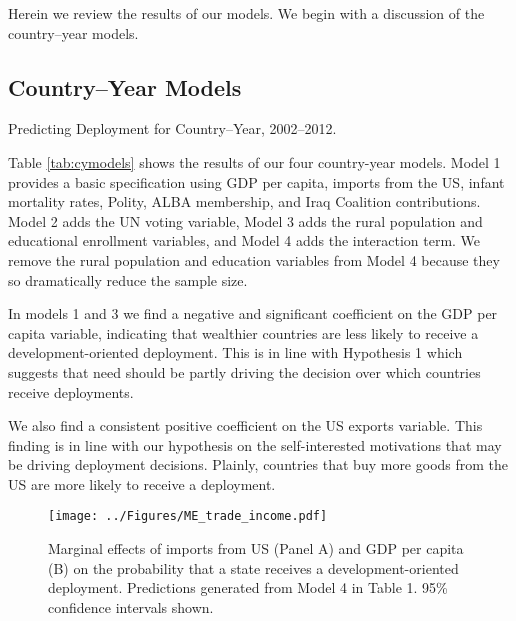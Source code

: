 \documentclass[12pt]{article}
\begin{document}
\begin{doublespace}
Herein we review the results of our models. We begin with a discussion of the country--year models. 


\subsection{Country--Year Models}



\begin{table}[t]
     \caption{Predicting Deployment for Country--Year, 2002--2012.}
     \label{tab:cymodels}
     \centering\scalebox{.75}{}
\end{table}

Table \ref{tab:cymodels} shows the results of our four country-year models. Model 1 provides a basic specification using GDP per capita, imports from the US, infant mortality rates, Polity, ALBA membership, and Iraq Coalition contributions. Model 2 adds the UN voting variable, Model 3 adds the rural population and educational enrollment variables, and Model 4 adds the interaction term. We remove the rural population and education variables from Model 4 because they so dramatically reduce the sample size.

In models 1 and 3 we find a negative and significant coefficient on the GDP per capita variable, indicating that wealthier countries are less likely to receive a development-oriented deployment. This is in line with Hypothesis 1 which suggests that need should be partly driving the decision over which countries receive deployments. 

We also find a consistent positive coefficient on the US exports variable. This finding is in line with our hypothesis on the self-interested motivations that may be driving deployment decisions. Plainly, countries that buy more goods from the US are more likely to receive a deployment.

\begin{figure}[t]
\begin{center}
\texttt{[image: ../Figures/ME\_trade\_income.pdf]}
\caption{Marginal effects of imports from US (Panel A) and GDP per capita (B) on the probability that a state receives a development-oriented deployment. Predictions generated from Model 4 in Table 1. 95\% confidence intervals shown.}
\label{fig:meCY}
\end{center}
\end{figure}


\end{doublespace}
\end{document}
